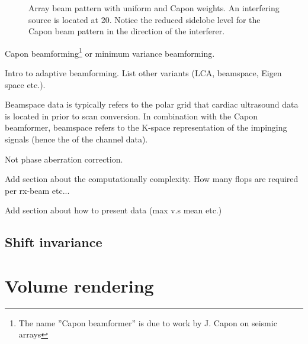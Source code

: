 \begin{figure}[t!]
\caption{Array beam pattern with uniform and Capon weights. An interfering source is located at 20\degree. Notice the reduced sidelobe level for the Capon beam pattern in the direction of the interferer.}
\end{figure}

Capon beamforming\footnote{The name ''Capon beamformer'' is due to work by J. Capon  on seismic arrays } or minimum variance beamforming.

Intro to adaptive beamforming. List other variants (LCA, beamspace, Eigen space etc.). 

Beamspace data is typically refers to the polar grid that cardiac ultrasound data is located in prior to scan conversion. In combination with the Capon beamformer, beamspace refers to the K-space representation of the impinging signals (hence the  of the channel data). 

Not phase aberration correction.

Add section about the computationally complexity. How many flops are required per rx-beam etc...

Add section about how to present data (max v.s mean etc.)
						
\subsection{Shift invariance}

\section{Volume rendering}\label{sec:volren}

